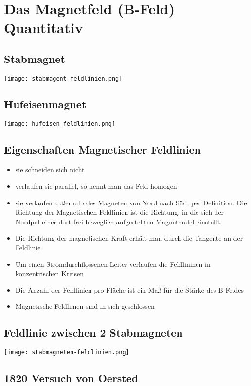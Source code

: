 \documentclass{article}
\begin{document}
\section*{Das Magnetfeld (B-Feld) Quantitativ}

\subsection*{Stabmagnet}

\texttt{[image: stabmagent-feldlinien.png]}

\subsection*{Hufeisenmagnet}

\texttt{[image: hufeisen-feldlinien.png]}

\subsection*{Eigenschaften Magnetischer Feldlinien}

\begin{itemize}
\item sie schneiden sich nicht
\item verlaufen sie parallel, so nennt man das Feld homogen
\item sie verlaufen außerhalb des Magneten von Nord nach Süd. per Definition: Die Richtung der Magnetischen Feldlinien ist die Richtung, in die sich der Nordpol einer dort frei beweglich aufgestellten Magnetnadel einstellt.
\item Die Richtung der magnetischen Kraft erhält man durch die Tangente an der Feldlinie
\item Um einen Stromdurchflossenen Leiter verlaufen die Feldlininen in konzentrischen Kreisen
\item Die Anzahl der Feldlinien pro Fläche ist ein Maß für die Stärke des B-Feldes
\item Magnetische Feldlinien sind in sich geschlossen
\end{itemize}

\subsection*{Feldlinie zwischen 2 Stabmagneten}

\texttt{[image: stabmagneten-feldlinien.png]}

\subsection*{1820 Versuch von Oersted}
\end{document}

